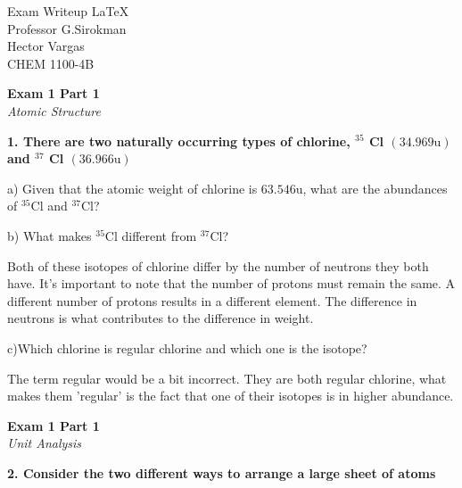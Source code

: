 \documentclass{article}
\begin{document}
    \thispagestyle{empty}
    \begin{center}
        Exam Writeup \LaTeX\\
        Professor G.Sirokman\\
        Hector Vargas\\
        CHEM 1100-4B\\
    \end{center}
    \pagebreak


    \begin{center}
        \textbf{Exam 1 Part 1}\\
        \textit{Atomic Structure}
    \end{center}
    \textbf{1. There are two naturally occurring types of chlorine, ${}^{35}$ Cl $(34.969 \si{\atomicmassunit})$ and ${}^{37}$ Cl $(36.966 \si{\atomicmassunit})$}

    a) Given that the atomic weight of chlorine is $63.546 \si{\atomicmassunit}$, what are the abundances of ${}^{35}$Cl and ${}^{37}$Cl?

    b) What makes ${}^{35}$Cl different from ${}^{37}$Cl?

    Both of these isotopes of chlorine differ by the number of neutrons they both have. It's important to note that the number of protons must remain the same. A different number of protons results in a different element. The difference in neutrons is what contributes to the difference in weight.

    c)Which chlorine is regular chlorine and which one is the isotope?

    The term regular would be a bit incorrect. They are both regular chlorine, what makes them 'regular' is the fact that one of their isotopes is in higher abundance.

    \pagebreak

    \begin{center}
        \textbf{Exam 1 Part 1}\\
        \textit{Unit Analysis}
    \end{center}
    \textbf{2. Consider the two different ways to arrange a large sheet of atoms}
\end{document}
